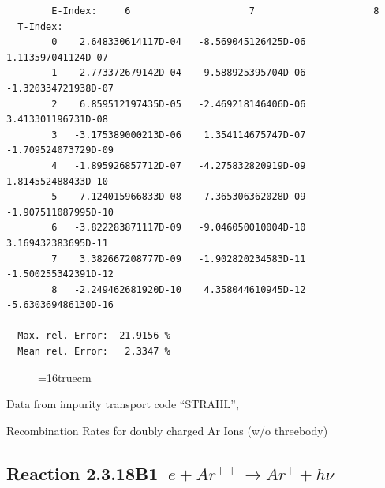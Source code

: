\documentclass[12pt,dvips]{article}
\begin{document}
\begin{small}
\begin{verbatim}
        E-Index:     6                     7                     8
  T-Index:
        0    2.648330614117D-04   -8.569045126425D-06    1.113597041124D-07
        1   -2.773372679142D-04    9.588925395704D-06   -1.320334721938D-07
        2    6.859512197435D-05   -2.469218146406D-06    3.413301196731D-08
        3   -3.175389000213D-06    1.354114675747D-07   -1.709524073729D-09
        4   -1.895926857712D-07   -4.275832820919D-09    1.814552488433D-10
        5   -7.124015966833D-08    7.365306362028D-09   -1.907511087995D-10
        6   -3.822283871117D-09   -9.046050010004D-10    3.169432383695D-11
        7    3.382667208777D-09   -1.902820234583D-11   -1.500255342391D-12
        8   -2.249462681920D-10    4.358044610945D-12   -5.630369486130D-16

  Max. rel. Error:  21.9156 %
  Mean rel. Error:   2.3347 %

\end{verbatim}\end{small}
\begin{figure} \label{2.3.18B0}
\epsfxsize=16truecm
\end{figure}
\newpage
Data from impurity transport code ``STRAHL'', \cite{kn:Behringer}

  Recombination Rates for doubly  charged Ar Ions (w/o threebody)
\subsection{
Reaction 2.3.18B1   $\  e + Ar^{++} \rightarrow  Ar^+ + h\nu$
}
\end{document}
